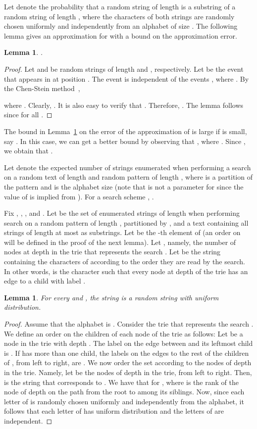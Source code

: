 \documentclass[12pt]{article}
\newtheorem{lemma}[theorem]{Lemma}
\begin{document}
Let  denote the probability that a random string of length 
is a substring of a random string of length , where the characters
of both strings are randomly chosen uniformly and independently
from an alphabet of size .
The following lemma gives an approximation for  with
a bound on the approximation error.
\begin{lemma}\label{lem:substring-probability}
.
\end{lemma}
\begin{proof}
Let  and  be random strings of length  and , respectively.
Let  be the event that  appears in  at position .
The event  is independent of the events
, where
.
By the Chen-Stein method~\cite{Chen75,Barbour92},

where .
Clearly, .
It is also easy to verify that .
Therefore,
.
The lemma follows since  
for all .
\end{proof}
The bound in Lemma~\ref{lem:substring-probability} on the error of the
approximation of  is large if  is small,
say .
In this case, we can get a better bound by observing that
, where .
Since ,
we obtain that .

Let  denote the expected number of strings
enumerated when performing a search  on a random
text of length  and random pattern of length , where
 is a partition of the pattern and
 is the alphabet size 
(note that  is not a parameter for  since the value
of  is implied from ).
For a search scheme , .

Fix , , , and .
Let  be the set of enumerated strings of length 
when performing search  on a random pattern of length ,
partitioned by ,
and a text  containing all strings of length at most  as
substrings.
Let  be the -th element of 
(an order on  will be defined in the proof of the next lemma).
Let , namely, the number of nodes
at depth  in the trie that represents the search .
Let  be the string containing the characters of  according to the
order they are read by the search.
In other words,  is the character such that 
every node at depth  of the trie has an edge to a child
with label .

\begin{lemma}\label{lem:Ali}
For every  and , the string  is a random string with uniform
distribution.
\end{lemma}
\begin{proof}
Assume that the alphabet is .
Consider the trie that represents the search .
We define an order on the children of each node of the trie as follows:
Let  be a node in the trie with depth .
The label on the edge between  and its leftmost child is 
.
If  has more than one child, the labels on the edges to the rest of the
children of , from left to right,
are .
We now order the set  according to the nodes of depth
 in the trie. Namely, let 
be the nodes of depth  in the trie, from left to right.
Then,  is the string that corresponds to .
We have that  for
,
where  is the rank of the node of depth  on the path from the
root to  among its siblings.
Now, since each letter of  is randomly chosen uniformly and independently
from the alphabet, it follows that each letter of  has uniform
distribution and the letters of  are independent.
\end{proof}
\end{document}
